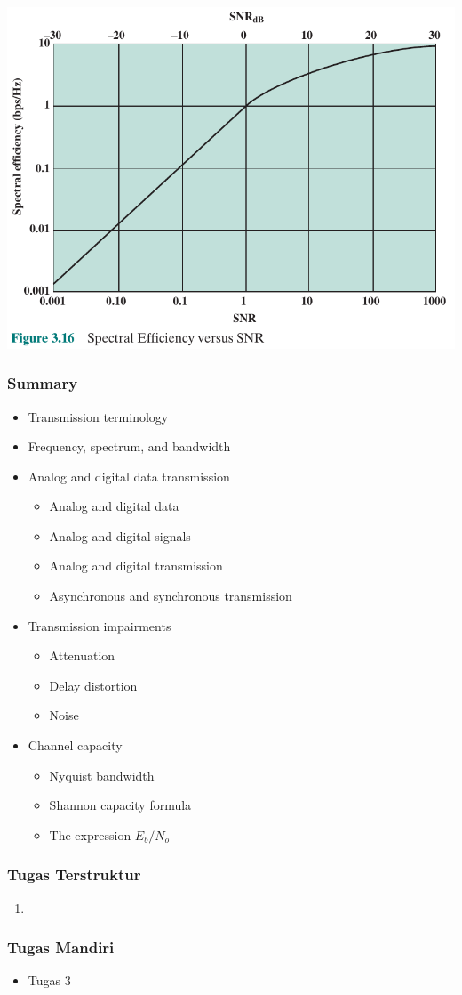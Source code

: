 \documentclass[pdflatex,compress]{beamer}
\begin{document}
\begin{frame}
	\begin{center}
		\includegraphics[width=0.9\linewidth]{img/img17}
	\end{center}
\end{frame}

\begin{frame}
	\frametitle{Summary}
	\begin{itemize}
		\item Transmission terminology
		\item Frequency, spectrum, and bandwidth
		\item Analog and digital data transmission
		\begin{itemize}
			\item Analog and digital data
			\item Analog and digital signals
			\item Analog and digital transmission
			\item Asynchronous and synchronous transmission
		\end{itemize}
		\item Transmission impairments
		\begin{itemize}
			\item  Attenuation
			\item Delay distortion
			\item Noise
		\end{itemize}
		\item Channel capacity
		\begin{itemize}
			\item Nyquist bandwidth
			\item Shannon capacity formula
			\item The expression $ E_b /N_o $
		\end{itemize}
	\end{itemize}
\end{frame}

\begin{frame}
	\frametitle{Tugas Terstruktur}
	\begin{enumerate}
		\item 
	\end{enumerate}
\end{frame}

\begin{frame}
	\frametitle{Tugas Mandiri}
	\begin{itemize}
		\item Tugas 3
	\end{itemize}
\end{frame}
\end{document}
